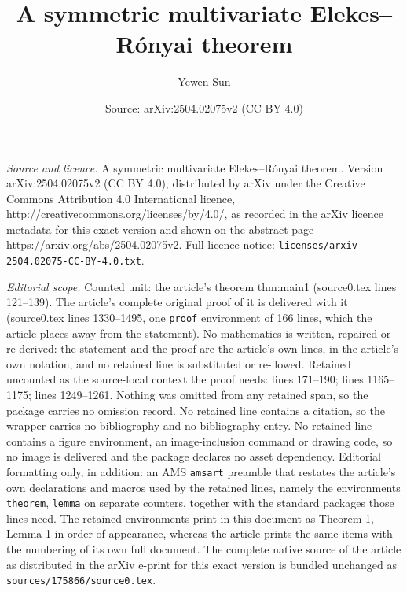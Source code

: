 \documentclass[10pt,a4paper]{amsart}
\title{A symmetric multivariate Elekes--R\'{o}nyai theorem}
\author{Yewen Sun}
\date{Source: arXiv:2504.02075v2 (CC BY 4.0)}
\begin{document}
\maketitle

\noindent\emph{Source and licence.} A symmetric multivariate Elekes--R\'{o}nyai theorem. Version arXiv:2504.02075v2 (CC BY 4.0), distributed by arXiv under the Creative Commons Attribution 4.0 International licence, http://creativecommons.org/licenses/by/4.0/, as recorded in the arXiv licence metadata for this exact version and shown on the abstract page https://arxiv.org/abs/2504.02075v2. Full licence notice: \texttt{licenses/arxiv-2504.02075-CC-BY-4.0.txt}.\par\smallskip

\noindent\textit{Editorial scope.} Counted unit: the article's theorem thm:main1 (source0.tex lines 121--139). The article's complete original proof of it is delivered with it (source0.tex lines 1330--1495, one \texttt{proof} environment of 166 lines, which the article places away from the statement). No mathematics is written, repaired or re-derived: the statement and the proof are the article's own lines, in the article's own notation, and no retained line is substituted or re-flowed.  Retained uncounted as the source-local context the proof needs: lines 171--190; lines 1165--1175; lines 1249--1261.  Nothing was omitted from any retained span, so the package carries no omission record.  No retained line contains a citation, so the wrapper carries no bibliography and no bibliography entry.  No retained line contains a figure environment, an image-inclusion command or drawing code, so no image is delivered and the package declares no asset dependency.  Editorial formatting only, in addition: an AMS \texttt{amsart} preamble that restates the article's own declarations and macros used by the retained lines, namely the environments \texttt{theorem}, \texttt{lemma} on separate counters, together with the standard packages those lines need.  The retained environments print in this document as Theorem 1, Lemma 1 in order of appearance, whereas the article prints the same items with the numbering of its own full document.  The complete native source of the article as distributed in the arXiv e-print for this exact version is bundled unchanged as \texttt{sources/175866/source0.tex}.
\end{document}
